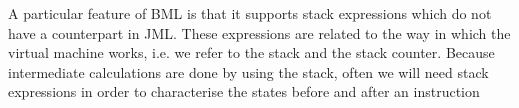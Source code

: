 %             
%             
%             
%	      	    
%               
%             
%              
%
%   
%
%
A particular feature of BML is that it supports stack expressions which do not have a counterpart in JML.
These expressions are related to
 the way in which the virtual machine works, i.e. we refer to the stack and the stack counter.
Because intermediate calculations are done by using the stack, often we will need stack expressions in order to characterise the states before and after an instruction
